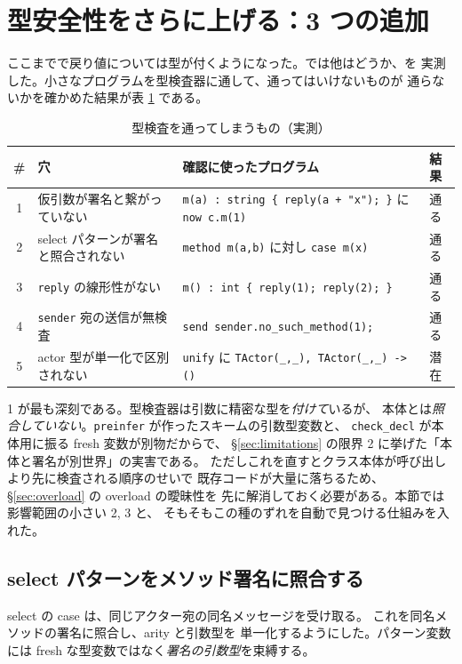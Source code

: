 \documentclass[11pt,a4paper]{ltjsarticle}
\theoremstyle{definition}
\theoremstyle{remark}
\begin{document}
\section{型安全性をさらに上げる：3 つの追加}
\label{sec:harden}

ここまでで戻り値については型が付くようになった。では他はどうか、を
実測した。小さなプログラムを型検査器に通して、通ってはいけないものが
通らないかを確かめた結果が表 \ref{tab:holes} である。

\begin{table}[htbp]
\centering
\small
\begin{tabular}{@{}clll@{}}
\toprule
\# & 穴 & 確認に使ったプログラム & 結果 \\
\midrule
1 & 仮引数が署名と繋がっていない
  & \texttt{m(a) : string \{ reply(a + "x"); \}} に \texttt{now c.m(1)}
  & 通る \\
2 & select パターンが署名と照合されない
  & \texttt{method m(a,b)} に対し \texttt{case m(x)}
  & 通る \\
3 & \texttt{reply} の線形性がない
  & \texttt{m() : int \{ reply(1); reply(2); \}}
  & 通る \\
4 & \texttt{sender} 宛の送信が無検査
  & \texttt{send sender.no\_such\_method(1);}
  & 通る \\
5 & actor 型が単一化で区別されない
  & \texttt{unify} に \texttt{TActor(\_,\_), TActor(\_,\_) -> ()}
  & 潜在 \\
\bottomrule
\end{tabular}
\caption{型検査を通ってしまうもの（実測）}
\label{tab:holes}
\end{table}

1 が最も深刻である。型検査器は引数に精密な型を\emph{付けて}いるが、
本体とは\emph{照合していない}。\texttt{preinfer} が作ったスキームの引数型変数と、
\texttt{check\_decl} が本体用に振る fresh 変数が別物だからで、
\S\ref{sec:limitations} の限界 2 に挙げた「本体と署名が別世界」の実害である。
ただしこれを直すとクラス本体が呼び出しより先に検査される順序のせいで
既存コードが大量に落ちるため、\S\ref{sec:overload} の overload の曖昧性を
先に解消しておく必要がある。本節では影響範囲の小さい 2, 3 と、
そもそもこの種のずれを自動で見つける仕組みを入れた。

\subsection{select パターンをメソッド署名に照合する}

select の case は、同じアクター宛の同名メッセージを受け取る。
これを同名メソッドの署名に照合し、arity と引数型を
単一化するようにした。パターン変数には
fresh な型変数ではなく\emph{署名の引数型}を束縛する。
\end{document}
